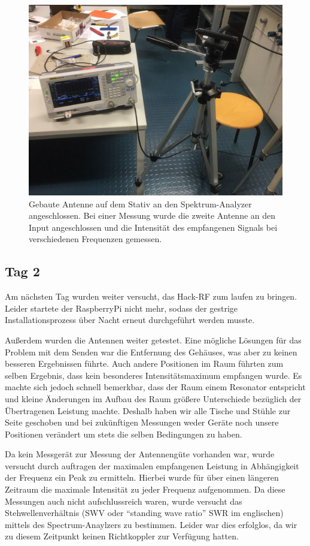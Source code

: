 \documentclass[titlepage,11pt,a4paper,ngerman]{article}
\begin{document}
\begin{figure}[ht]
	\centering
	\includegraphics[scale=0.35, trim={0cm 8cm 3cm 2cm}, clip]{Bilder/Ant_Fktgen}
	\caption{Gebaute Antenne auf dem Stativ an den Spektrum-Analyzer angeschlossen. Bei einer Messung wurde die zweite Antenne an den Input angeschlossen und die Intensität des empfangenen Signals bei verschiedenen Frequenzen gemessen.}
	\label{ersteMessung}
\end{figure}


\pagebreak


\subsection{Tag 2}

Am nächsten Tag wurden weiter versucht, das Hack-RF zum laufen zu bringen. Leider startete der RaspberryPi nicht mehr, sodass der gestrige Installationsprozess über Nacht erneut durchgeführt werden musste.\par
Außerdem wurden die Antennen weiter getestet. Eine mögliche Lösungen für das Problem mit dem Senden war die Entfernung des Gehäuses, was aber zu keinen besseren Ergebnissen führte. Auch andere Positionen im Raum führten zum selben Ergebnis, dass kein besonderes Intensitätsmaximum empfangen wurde. Es machte sich jedoch schnell bemerkbar, dass der Raum einem Resonator entspricht und kleine Änderungen im Aufbau des Raum größere Unterschiede bezüglich der Übertragenen Leistung machte. Deshalb haben wir alle Tische und Stühle zur Seite geschoben und bei zukünftigen Messungen weder Geräte noch unsere Positionen verändert um stets die selben Bedingungen zu haben.\par
Da kein Messgerät zur Messung der Antennengüte vorhanden war, wurde versucht durch auftragen der maximalen empfangenen Leistung in Abhängigkeit der Frequenz ein Peak zu ermitteln. Hierbei wurde für über einen längeren Zeitraum die maximale Intensität zu jeder Frequenz aufgenommen. Da diese Messungen auch nicht aufschlussreich waren, wurde versucht das Stehwellenverhältnis (SWV oder ``standing wave ratio'' SWR im englischen) mittels des Spectrum-Anaylzers zu bestimmen. Leider war dies erfolglos, da wir zu diesem Zeitpunkt keinen Richtkoppler zur Verfügung hatten.
\end{document}
